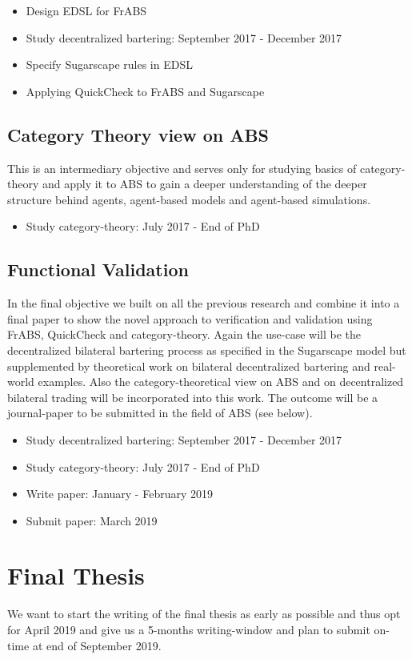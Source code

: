 \begin{itemize}
\item Design EDSL for FrABS
\item Study decentralized bartering: September 2017 - December 2017
\item Specify Sugarscape rules in EDSL
\item Applying QuickCheck to FrABS and Sugarscape
\end{itemize}

\subsection{Category Theory view on ABS}
This is an intermediary objective and serves only for studying basics of category-theory and apply it to ABS to gain a deeper understanding of the deeper structure behind agents, agent-based models and agent-based simulations.

\begin{itemize}
\item Study category-theory: July 2017 - End of PhD
\end{itemize}

\subsection{Functional Validation}
In the final objective we built on all the previous research and combine it into a final paper to show the novel approach to verification and validation using FrABS, QuickCheck and category-theory. Again the use-case will be the decentralized bilateral bartering process as specified in the Sugarscape model but supplemented by theoretical work on bilateral decentralized bartering and real-world examples. Also the category-theoretical view on ABS and on decentralized bilateral trading will be incorporated into this work. The outcome will be a journal-paper to be submitted in the field of ABS (see below).

\begin{itemize}
	\item Study decentralized bartering: September 2017 - December 2017
	\item Study category-theory: July 2017 - End of PhD
	\item Write paper: January - February 2019
	\item Submit paper: March 2019
\end{itemize}

\section{Final Thesis}
We want to start the writing of the final thesis as early as possible and thus opt for April 2019 and give us a 5-months writing-window and plan to submit on-time at end of September 2019.

